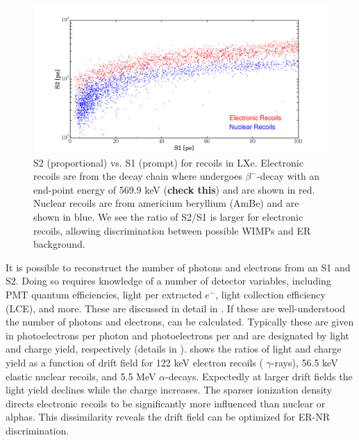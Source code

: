 \begin{figure}
\centering
\includegraphics[width=\textwidth]{ERNRComparison}
\caption{S2 (proportional) vs. S1 (prompt) for recoils in LXe.  Electronic recoils are from the  decay chain where
 undergoes $\beta^{-}$-decay with an end-point energy of 569.9 keV (\textbf{check this}) and are shown in red.  Nuclear
recoils are from americium beryllium (AmBe) and are shown in blue.  We see the ratio of S2/S1 is larger for electronic recoils,
allowing discrimination between possible WIMPs and ER background.}
\label{fig:tpcs_signals_ernr}
\end{figure}

It is possible to reconstruct the number of photons and electrons from an S1 and S2.  Doing so requires knowledge of a number of detector
variables, including PMT quantum efficiencies, light per extracted $e^{-}$, light collection efficiency (LCE), and more.  These are
discussed in detail in .  If these are well-understood the number of photons and electrons,
can be calculated.  Typically these are given in photoelectrons per photon and photoelectrons per \electron and are designated by
light and charge yield, respectively (details in \secref{}).   shows the ratios of light and
charge yield as a function of drift field for 122 keV electron recoils ( $\gamma$-rays), 56.5 keV elastic nuclear recoils, and
5.5 MeV $\alpha$-decays.  Expectedly at larger drift fields the light yield declines while the charge increases.  The sparser
ionization density directs electronic recoils to be significantly more influenced than nuclear or alphas.  This dissimilarity reveals
the drift field can be optimized for ER-NR discrimination.

